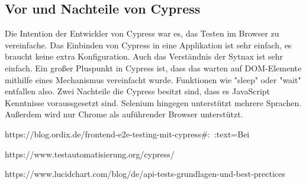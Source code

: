 \subsection{Vor und Nachteile von Cypress}

Die Intention der Entwickler von Cypress war es, das Testen im Browser zu vereinfache. Das Einbinden von Cypress in eine Applikation ist sehr einfach, es braucht keine extra Konfiguration. Auch das Verständnis der Sytnax ist sehr einfach. Ein großer Pluspunkt in Cypress ist, dass das warten auf DOM-Elemente mithilfe eines Mechanismus vereinfacht wurde. Funktionen wie "sleep" oder "wait" entfallen also. 
Zwei Nachteile die Cypress besitzt sind, dass es JavaScript Kenntnisse voraussgesetzt sind. Selenium hingegen unterstützt mehrere Sprachen. Außerdem wird nur Chrome als auführender Browser unterstützt.






\cite{Integration_von_Cypress}
https://blog.ordix.de/frontend-e2e-testing-mit-cypress#:~:text=Bei%

\cite{Cypress}
https://www.testautomatisierung.org/cypress/

\cite{API_Tests}
https://www.lucidchart.com/blog/de/api-tests-grundlagen-und-best-prectices